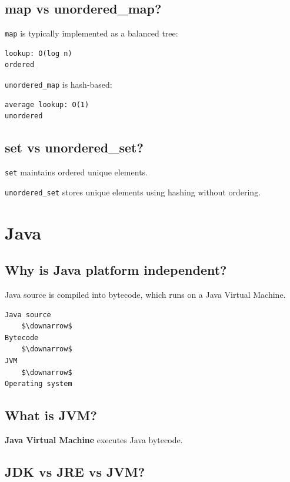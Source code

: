 \subsection{map vs unordered\_map?}

\texttt{map} is typically implemented as a balanced tree:

\begin{lstlisting}
lookup: O(log n)
ordered
\end{lstlisting}

\texttt{unordered\_map} is hash-based:

\begin{lstlisting}
average lookup: O(1)
unordered
\end{lstlisting}

\medskip

\subsection{set vs unordered\_set?}

\texttt{set} maintains ordered unique elements.

\texttt{unordered\_set} stores unique elements using hashing without ordering.

\medskip

\section{Java}

\subsection{Why is Java platform independent?}

Java source is compiled into bytecode, which runs on a Java Virtual Machine.

\begin{lstlisting}
Java source
    $\downarrow$
Bytecode
    $\downarrow$
JVM
    $\downarrow$
Operating system
\end{lstlisting}

\medskip

\subsection{What is JVM?}

\textbf{Java Virtual Machine} executes Java bytecode.

\medskip

\subsection{JDK vs JRE vs JVM?}

